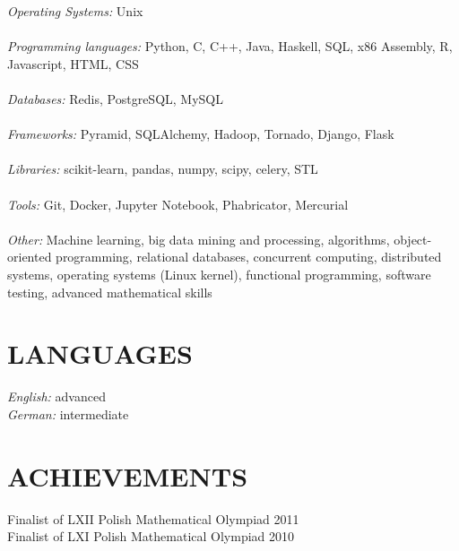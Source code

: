 \documentclass[margin, 10pt]{res} %
\begin{document}
\begin{resume}
{\sl Operating Systems:} Unix \\ \\
{\sl Programming languages:}
Python, C, C++, Java, Haskell, SQL, x86 Assembly, R, Javascript, HTML, CSS \\ \\
{\sl Databases:} Redis, PostgreSQL, MySQL \\ \\
{\sl Frameworks:} Pyramid, SQLAlchemy, Hadoop, Tornado, Django, Flask \\ \\
{\sl Libraries:} scikit-learn, pandas, numpy, scipy, celery, STL \\ \\
{\sl Tools:} Git, Docker, Jupyter Notebook, Phabricator, Mercurial \\ \\
{\sl Other:} Machine learning, big data mining and processing, algorithms, object-oriented programming, relational databases, concurrent computing, distributed systems, operating systems (Linux kernel), functional programming, software testing, advanced mathematical skills


\section{ LANGUAGES } 

{\sl English:} advanced \\
{\sl German:} intermediate



\section{ ACHIEVEMENTS } 

Finalist of LXII Polish Mathematical Olympiad \hfill 2011 \\
Finalist of LXI Polish Mathematical Olympiad \hfill 2010


\end{resume}
\end{document}
